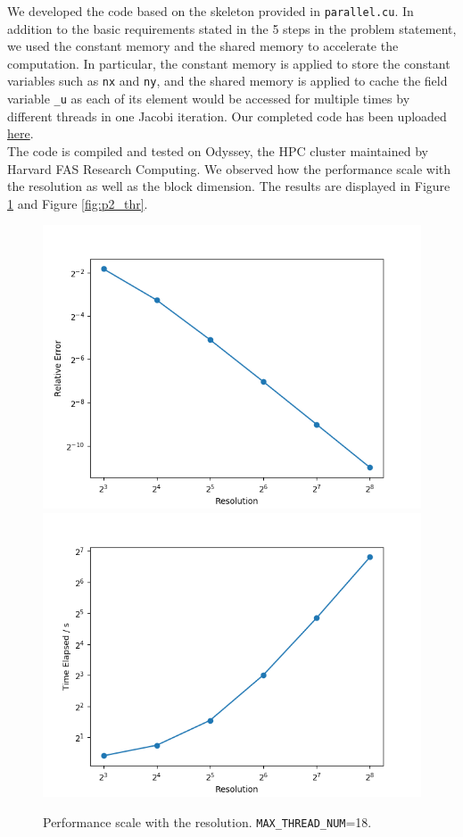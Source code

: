 \begin{solution}

We developed the code based on the skeleton provided in \texttt{parallel.cu}. 
In addition to the basic requirements stated in the 5 steps in the problem statement, we used the constant memory and the shared memory to accelerate the computation. 
In particular, the constant memory is applied to store the constant variables such as \texttt{nx} and \texttt{ny}, and the shared memory is applied to cache the field variable \texttt{\_u} as each of its element would be accessed for multiple times by different threads in one Jacobi iteration. 
Our completed code has been uploaded  \href{https://github.com/iacs-ac290r-2019-2/homework/tree/master/HW2/Group/Problem2}{here}. 
\\
The code is compiled and tested on Odyssey, the HPC cluster maintained by Harvard FAS Research Computing. We observed how the performance scale with the resolution as well as the block dimension. The results are displayed in Figure \ref{fig:p2_res} and Figure \ref{fig:p2_thr}. 

\begin{figure}[H]
    \centering
    \includegraphics[scale=0.4]{YiqiXie/res_err.png}
    \includegraphics[scale=0.4]{YiqiXie/res_time.png}
    \caption{Performance scale with the resolution. \texttt{MAX\_THREAD\_NUM}=18. }
    \label{fig:p2_res}
\end{figure}


\end{solution}
